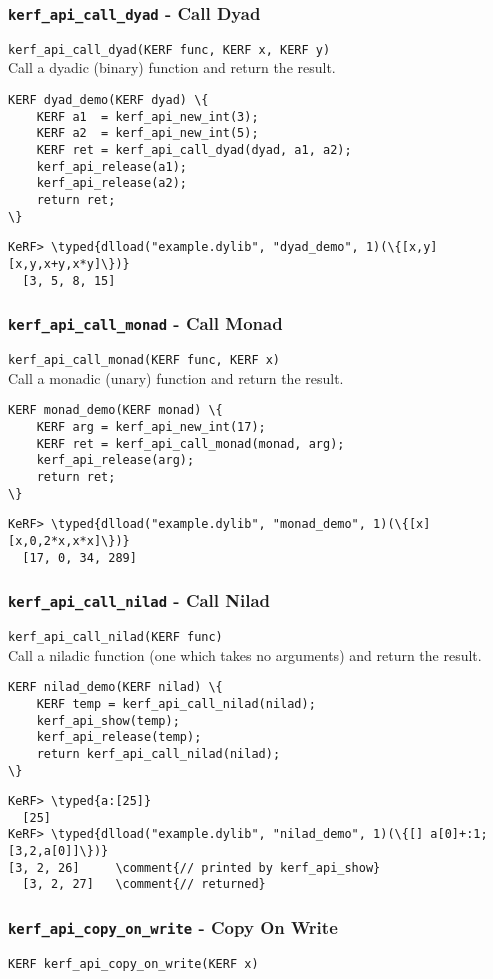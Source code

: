 \documentclass{article}
\newcommand{\typed}[1]{\textcolor{TealBlue}{#1}}
\newcommand{\comment}[1]{\textcolor{Orange}{#1}}
\newcommand{\ffidef}[3]{\subsubsection{\texttt{#1} - #2}\label{ffi:#3}}
\begin{document}
\ffidef{kerf\_api\_call\_dyad}{Call Dyad}{kerfApiCallDyad}
\texttt{kerf\_api\_call\_dyad(KERF func, KERF x, KERF y)}\\

Call a dyadic (binary) function and return the result.
\begin{Verbatim}
KERF dyad_demo(KERF dyad) \{
	KERF a1  = kerf_api_new_int(3);
	KERF a2  = kerf_api_new_int(5);
	KERF ret = kerf_api_call_dyad(dyad, a1, a2);
	kerf_api_release(a1);
	kerf_api_release(a2);
	return ret;
\}
\end{Verbatim}
\begin{Verbatim}
KeRF> \typed{dlload("example.dylib", "dyad_demo", 1)(\{[x,y] [x,y,x+y,x*y]\})}
  [3, 5, 8, 15]
\end{Verbatim}

\ffidef{kerf\_api\_call\_monad}{Call Monad}{kerfApiCallMonad}
\texttt{kerf\_api\_call\_monad(KERF func, KERF x)}\\

Call a monadic (unary) function and return the result.
\begin{Verbatim}
KERF monad_demo(KERF monad) \{
	KERF arg = kerf_api_new_int(17);
	KERF ret = kerf_api_call_monad(monad, arg);
	kerf_api_release(arg);
	return ret;
\}
\end{Verbatim}
\begin{Verbatim}
KeRF> \typed{dlload("example.dylib", "monad_demo", 1)(\{[x] [x,0,2*x,x*x]\})}
  [17, 0, 34, 289]
\end{Verbatim}

\ffidef{kerf\_api\_call\_nilad}{Call Nilad}{kerfApiCallNilad}
\texttt{kerf\_api\_call\_nilad(KERF func)}\\

Call a niladic function (one which takes no arguments) and return the result.

\begin{Verbatim}
KERF nilad_demo(KERF nilad) \{
	KERF temp = kerf_api_call_nilad(nilad);
	kerf_api_show(temp);
	kerf_api_release(temp);
	return kerf_api_call_nilad(nilad);
\}
\end{Verbatim}
\begin{Verbatim}
KeRF> \typed{a:[25]}
  [25]
KeRF> \typed{dlload("example.dylib", "nilad_demo", 1)(\{[] a[0]+:1; [3,2,a[0]]\})}
[3, 2, 26]     \comment{// printed by kerf_api_show}
  [3, 2, 27]   \comment{// returned}
\end{Verbatim}

\ffidef{kerf\_api\_copy\_on\_write}{Copy On Write}{kerfApiCopyOnWrite}
\texttt{KERF kerf\_api\_copy\_on\_write(KERF x)}\\
\end{document}
